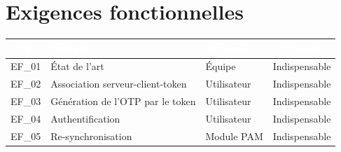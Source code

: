 \documentclass{"../../res/univ-projet"}
\begin{document}
\section{Exigences fonctionnelles}
\begin{tabular}{|c|l|l|c|}
    \hline
    \rowcolor{gray}
    \textcolor{white}{Id} & \textcolor{white}{Intitulé} & \textcolor{white}{Acteur(s)} & \textcolor{white}{Priorité}\\
    \hline
    EF\_01 & État de l'art & Équipe & Indispensable\\
    \hline
    EF\_02 & Association serveur-client-token & Utilisateur & Indispensable\\
    \hline
    EF\_03 & Génération de l'OTP par le token & Utilisateur & Indispensable\\
    \hline
    EF\_04 & Authentification & Utilisateur & Indispensable\\
    \hline
    EF\_05 & Re-synchronisation & Module PAM & Indispensable\\
    \hline
\end{tabular}\
\end{document}
